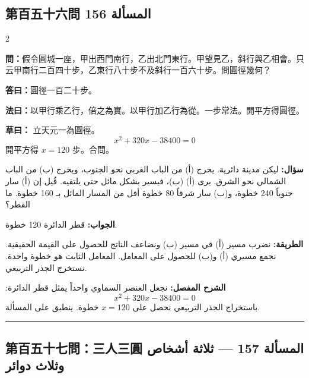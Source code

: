 \documentclass[11pt,a4paper]{article}
\newcommand{\ar}[1]{\arabicfont\beginR #1\endR}
\newcommand{\arb}[1]{\textbf{\arabicfont\beginR #1\endR}}
\newcommand{\longline}{\noindent\rule{\textwidth}{0.4pt}}
\newcommand{\arnote}[1]{\textcolor{arabicblue}{\ar{#1}}}
\newcommand{\wen}[1]{\par\noindent\textbf{\textcolor{probcolor}{問：}}{#1}\par}
\newcommand{\da}[1]{\par\noindent\textbf{\textcolor{anscolor}{答曰：}}{#1}\par}
\newcommand{\fayue}[1]{\par\noindent\textbf{\textcolor{methodcolor}{法曰：}}{#1}\par}
\newcommand{\caoyue}[1]{\par\noindent\textbf{草曰：}{#1}\par}
\newcommand{\arwen}[1]{\par\noindent\arb{سؤال: }\arnote{#1}\par}
\newcommand{\arjwb}[1]{\par\noindent\arb{الجواب: }\arnote{#1}\par}
\newcommand{\arqwd}[1]{\par\noindent\arb{الطريقة: }\arnote{#1}\par}
\newcommand{\arshr}[1]{\par\noindent\arb{الشرح المفصل: }\arnote{#1}\par}
\begin{document}
\subsection*{第百五十六問 \hfill \ar{المسألة 156}}

\begin{paracol}{2}

\begin{leftcolumn}
\wen{假令圓城一座，甲出西門南行，乙出北門東行。甲望見乙，斜行與乙相會。只云甲南行二百四十步，乙東行八十步不及斜行一百六十步。問圓徑幾何？}

\da{圓徑一百二十步。}

\fayue{以甲行乘乙行，倍之為實。以甲行加乙行為從。一步常法。開平方得圓徑。}

\caoyue{
立天元一為圓徑。
$$x^2 + 320x - 38400 = 0$$
開平方得 $x = 120$ 步。合問。}
\end{leftcolumn}

\begin{rightcolumn}
\arwen{ليكن مدينة دائرية. يخرج (أ) من الباب الغربي نحو الجنوب، ويخرج (ب) من الباب الشمالي نحو الشرق. يرى (أ) (ب)، فيسير بشكل مائل حتى يلتقيه. قُيل إن (أ) سار جنوباً 240 خطوة، و(ب) سار شرقاً 80 خطوة أقل من المسار المائل بـ 160 خطوة. ما القطر؟}

\arjwb{قطر الدائرة 120 خطوة.}

\arqwd{نضرب مسير (أ) في مسير (ب) ونضاعف الناتج للحصول على القيمة الحقيقية. نجمع مسيري (أ) و(ب) للحصول على المعامل. المعامل الثابت هو خطوة واحدة. نستخرج الجذر التربيعي.}

\arshr{نجعل العنصر السماوي واحداً يمثل قطر الدائرة:
$$x^2 + 320x - 38400 = 0$$
باستخراج الجذر التربيعي نحصل على $x = 120$ خطوة. ينطبق على المسألة.}
\end{rightcolumn}

\end{paracol}

\vspace{0.3cm}
\longline

\subsection*{第百五十七問：三人三圓 \hfill \ar{المسألة 157 — ثلاثة أشخاص وثلاث دوائر}}
\end{document}
